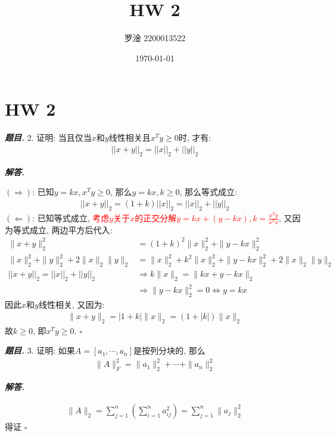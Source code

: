 \documentclass[10pt, a4paper, oneside]{ctexart}
\title{\textbf{HW 2}}
\author{罗淦  2200013522}
\date{\today}
\newcommand{\norm}[1]{\| #1 \|}
\newenvironment{problem}{\begin{framed}\par\noindent\textbf{\textit{题目. }}}{\end{framed}\par}
\newenvironment{solution}{%
  \par\noindent\textbf{\textit{解答. }}\ignorespaces
}{%
  \hfill\ensuremath{\square}\par %
}
\begin{document}
\maketitle


\section{HW 2}
\begin{problem}
2. 证明: 当且仅当$x$和$y$线性相关且$x^Ty\geq 0$时, 才有:
\begin{align*}
    || x+y||_2 = ||x||_2+||y||_2
\end{align*}
\end{problem}

\begin{solution}
$(\Rightarrow)$: 已知$y=kx, x^Ty\geq 0$, 那么$y=kx, k\geq 0$, 那么等式成立:
\begin{align*}
    ||x+y||_2=(1+k)||x||_2=||x||_2+||y||_2
\end{align*}
$(\Leftarrow)$: 已知等式成立, \textcolor{red}{考虑$y$关于$x$的正交分解$y=kx+(y-kx), k=\frac{x^Ty}{x^Tx} $}, 又因为等式成立, 两边平方后代入:
\begin{align*}
    \norm{x+y}_2^2&=(1+k)^2\norm{x}_2^2+\norm{y-kx}_2^2\\
    \norm{x}_2^2+\norm{y}_2^2+2\norm{x}_2\norm{y}_2&=\norm{x}_2^2+k^2\norm{x}_2^2+\norm{y-kx}_2^2+2\norm{x}_2\norm{y}_2\\
    || x+y||_2 = ||x||_2+||y||_2&\Rightarrow k\norm{x}_2=\norm{kx+y-kx}_2\\
    &\Rightarrow \norm{y-kx}_2^2=0\iff y=kx
\end{align*}
因此$x$和$y$线性相关, 又因为:
\begin{align*}
    \norm{x+y}_2=|1+k|\norm{x}_2=(1+|k|)\norm{x}_2
\end{align*}
故$k\geq 0$, 即$x^Ty\geq 0$.
\end{solution}

\begin{problem}
    3. 证明: 如果$A=[a_1,\cdots,a_n]$是按列分块的, 那么 
    \begin{align*}
        \norm{A}_F^2=\norm{a_1}_2^2+\cdots+\norm{a_n}_2^2
    \end{align*}
\end{problem}

\begin{solution}
\begin{align*}
    \norm{A}_2=\sum_{j=1}^n(\sum_{i=1}^n a_{ij}^2 )=\sum_{j=1}^n \norm{a_j}_2^2
\end{align*}
得证
\end{solution}
\end{document}
